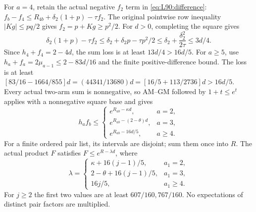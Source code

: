 For $a=4$, retain the actual negative $f_2$ term in
\eqref{eq:L90:difference}:
$f_b-f_4\le R_{4b}+\delta_2(1+p)-\tau f_2$.
The original pointwise row inequality $|Kg|\le pq/2$ gives
$f_2=p+Kg\ge p^2/2$.
For $d>0$, completing the square gives
\[
\delta_2(1+p)-\tau f_2
\le\delta_2+\delta_2p-\tau p^2/2
\le\delta_2+\frac{\delta_2^2}{2\tau}\le3d/4.
\]
Since $h_4+f_4=2-4d$, the sum loss is at least $13d/4>16d/5$.
For $a\ge5$, use $h_a+f_a=2\mu_{a-1}\le2-83d/16$ and the
finite positive-difference bound. The loss is at least
$[83/16-1664/855]d=(44341/13680)d
=[16/5+113/2736]d>16d/5$.
Every actual two-arm sum is nonnegative, so AM--GM followed by
$1+t\le e^t$ applies with a nonnegative square base and gives
\begin{equation}\tag{L90.2.3}\label{eq:L90:pair}
h_af_b\le\begin{cases}
e^{R_{ab}-\kappa d},&a=2,\\
e^{R_{ab}-(2-\theta)d},&a=3,\\
e^{R_{ab}-16d/5},&a\ge4.
\end{cases}
\end{equation}
For a finite ordered pair list, its intervals are disjoint; sum them
once into $R$. The actual product $F$ satisfies $F\le e^{R-\lambda d}$,
where
\[
\lambda=\begin{cases}
\kappa+16(j-1)/5,&a_1=2,\\
2-\theta+16(j-1)/5,&a_1=3,\\
16j/5,&a_1\ge4.
\end{cases}
\]
For $j\ge2$ the first two values are at least $607/160,767/160$.
No expectations of distinct pair factors are multiplied.

